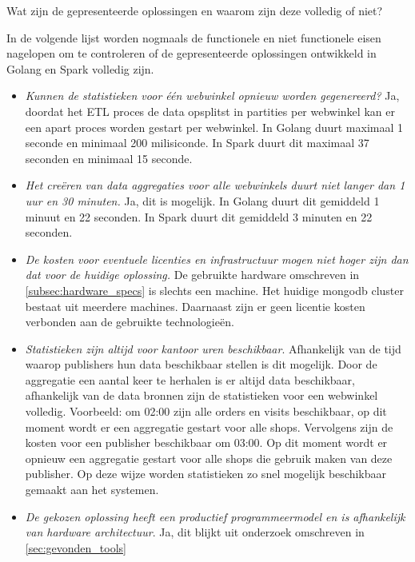 Wat zijn de gepresenteerde oplossingen en waarom zijn deze volledig of niet?

In de volgende lijst worden nogmaals de functionele en niet functionele eisen nagelopen om te controleren of de gepresenteerde oplossingen ontwikkeld in Golang en Spark volledig zijn.

\begin{itemize}
    \item \textit{Kunnen de statistieken voor één webwinkel opnieuw worden gegenereerd?} Ja, doordat het ETL proces de data opsplitst in partities per webwinkel kan er een apart proces worden gestart per webwinkel. In Golang duurt maximaal 1 seconde en minimaal 200 milisiconde. In Spark duurt dit maximaal 37 seconden en minimaal 15 seconde.
    
    \item \textit{ Het creëren van data aggregaties voor alle webwinkels duurt niet langer dan 1 uur en 30 minuten.} Ja, dit is mogelijk. In Golang duurt dit gemiddeld 1 minuut en 22 seconden. In Spark duurt dit gemiddeld 3 minuten en 22 seconden.
    
    \item \textit{De kosten voor eventuele licenties en infrastructuur mogen niet hoger zijn dan dat voor de huidige oplossing.} De gebruikte hardware omschreven in \ref{subsec:hardware_specs} is slechts een machine. Het huidige mongodb cluster bestaat uit meerdere machines. Daarnaast zijn er geen licentie kosten verbonden aan de gebruikte technologieën.
    
    \item \textit{Statistieken zijn altijd voor kantoor uren beschikbaar}. Afhankelijk van de tijd waarop publishers hun data beschikbaar stellen is dit mogelijk. Door de aggregatie een aantal keer te herhalen is er altijd data beschikbaar, afhankelijk van de data bronnen zijn de statistieken voor een webwinkel volledig. Voorbeeld: om 02:00 zijn alle orders en visits beschikbaar, op dit moment wordt er een aggregatie gestart voor alle shops. Vervolgens zijn de kosten voor een publisher beschikbaar om 03:00. Op dit moment wordt er opnieuw een aggregatie gestart voor alle shops die gebruik maken van deze publisher. Op deze wijze worden statistieken zo snel mogelijk beschikbaar gemaakt aan het systemen.
    
    \item \textit{De gekozen oplossing heeft een productief programmeermodel en is afhankelijk van hardware architectuur}. Ja, dit blijkt uit onderzoek omschreven in  \ref{sec:gevonden_tools}
    

\end{itemize}
